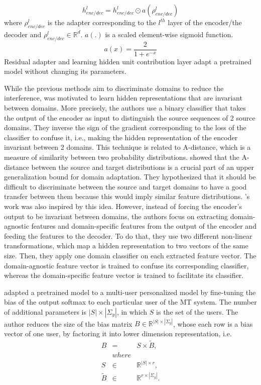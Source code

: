 \begin{equation}
h_{enc/dec}^l = h_{enc/dec}^{l} \odot a(\rho^{l}_{enc/dec})
\end{equation}
where $\rho^{l}_{enc/dec}$ is the adapter corresponding to the $l^{th}$ layer of the encoder/the decoder and $\rho^{l}_{enc/dec} \in \mathbb{R}^d$. $a(.)$ is a scaled
element-wise sigmoid function.
$$a(x) = \frac{2}{1+e^{-x}}$$
Residual adapter and learning hidden unit contribution layer adapt a pretrained model without changing its parameters. 

While the previous methods aim to discriminate domains to reduce the interference,\citet{Britz17effective} was motivated to learn hidden representations that are invariant between domains. More precisely, the authors use a binary classifier that takes the output of the encoder as input to distinguish the source sequences of 2 source domains. They inverse the sign of the gradient corresponding to the loss of the classifier to confuse it, i.e., making the hidden representation of the encoder invariant between 2 domains. This technique is related to A-distance, which is a measure of similarity between two probability distributions. \citet{Ben07analysis} showed that the A-distance between the
source and target distributions is a crucial part of an upper generalization bound for domain adaptation. They hypothesized that it should be difficult to discriminate between the source and target domains to have a good transfer between them because
this would imply similar feature distributions. \citet{Zeng18multidomain}'s work was also inspired by this idea. However, instead of forcing the encoder's output to be invariant between domains, the authors focus on extracting domain-agnostic features and domain-specific features from the output of the encoder and feeding the features to the decoder. To do that, they use two different non-linear transformations, which map a hidden representation to two vectors of the same size. Then, they apply one domain classifier on each extracted feature vector. The domain-agnostic feature vector is trained to confuse its corresponding classifier, whereas the domain-specific feature vector is trained to facilitate its classifier.

\citet{Michel18extreme} adapted a pretrained model to a multi-user personalized model by fine-tuning the
bias of the output softmax to each particular user of the MT system. The number of additional parameters is $|S| \times |\Sigma_y|$, in which $S$ is the set of the users. The author reduces the size of the bias matrix $B \in \mathbb{R}^{|S| \times |\Sigma_y|}$, whose each row is a bias vector of one user, by factoring it into lower dimension representation, i.e.
\begin{equation}
\begin{array}{rcl}
B &=& S \times \tilde{B}, \\
&where& \\
S & \in & \mathbb{R}^{|S| \times r}, \\
\tilde{B} & \in & \mathbb{R}^{r \times |\Sigma_y|}.
\end{array}
\end{equation}

